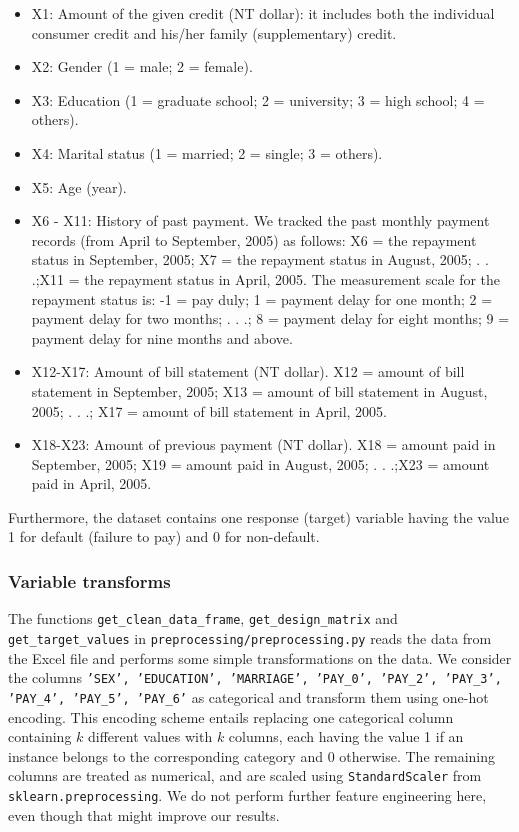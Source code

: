 \documentclass{article}
\begin{document}
\begin{itemize}
    \item X1: Amount of the given credit (NT dollar): it includes both the individual consumer credit and his/her family (supplementary) credit.
    \item X2: Gender (1 = male; 2 = female).
    \item X3: Education (1 = graduate school; 2 = university; 3 = high school; 4 = others).
    \item X4: Marital status (1 = married; 2 = single; 3 = others).
    \item X5: Age (year).
    \item X6 - X11: History of past payment. We tracked the past monthly payment records (from April to September, 2005) as follows: X6 = the repayment status in September, 2005; X7 = the repayment status in August, 2005; . . .;X11 = the repayment status in April, 2005. The measurement scale for the repayment status is: -1 = pay duly; 1 = payment delay for one month; 2 = payment delay for two months; . . .; 8 = payment delay for eight months; 9 = payment delay for nine months and above.
    \item X12-X17: Amount of bill statement (NT dollar). X12 = amount of bill statement in September, 2005; X13 = amount of bill statement in August, 2005; . . .; X17 = amount of bill statement in April, 2005.
    \item X18-X23: Amount of previous payment (NT dollar). X18 = amount paid in September, 2005; X19 = amount paid in August, 2005; . . .;X23 = amount paid in April, 2005.
\end{itemize}

Furthermore, the dataset contains one response (target) variable having the value 1 for default (failure to pay) and 0 for non-default.
\subsubsection{Variable transforms}
The functions \texttt{get\_clean\_data\_frame}, \texttt{get\_design\_matrix} and \texttt{get\_target\_values} in \texttt{preprocessing/preprocessing.py} reads the data from the Excel file and performs some simple transformations on the data. We consider the columns \texttt{'SEX',
'EDUCATION',
'MARRIAGE',
'PAY\_0',
'PAY\_2',
'PAY\_3',
'PAY\_4',
'PAY\_5',
'PAY\_6'}
as categorical and transform them using one-hot encoding. This encoding scheme entails replacing one categorical column containing $k$ different values with $k$ columns, each having the value 1 if an instance belongs to the corresponding category and 0 otherwise. The remaining columns are treated as numerical, and are scaled using \texttt{StandardScaler} from \texttt{sklearn.preprocessing}. We do not perform further feature engineering here, even though that might improve our results.
\end{document}
